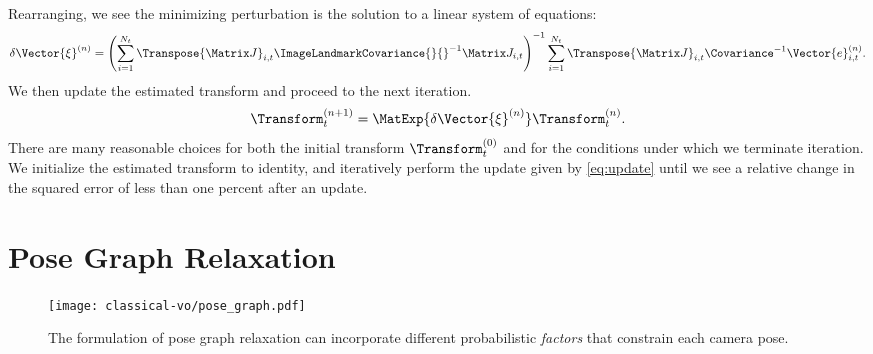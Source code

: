 Rearranging, we see the minimizing perturbation is the solution to a
linear system of equations:
\begin{equation}
  \delta\Vector{\xi}^{(n)} = 
  \left( \sum_{i=1}^{N_t} \Transpose{\Matrix J}_{i,t}
  \ImageLandmarkCovariance{}{}^{-1} \Matrix J_{i,t} \right)^{-1}
  \sum_{i=1}^{N_t} \Transpose{\Matrix J}_{i,t}
  \Covariance^{-1} \Vector{e}_{i,t}^{(n)}. 
\label{eq:least-squares-iteration}
\end{equation}
We then update the estimated transform and proceed to the next iteration.
\begin{equation}
  \Transform_t^{(n+1)} = \MatExp{\delta\Vector{\xi}^{(n)}} \Transform_t^{(n)}. \label{eq:update}
\end{equation}
There are many reasonable choices for both the initial transform
$\Transform_t^{(0)}$ and for the conditions under which we terminate
iteration. We initialize the estimated transform to identity, and iteratively
perform the update given by \cref{eq:update} until we see a relative change in
the squared error of less than one percent after an update. 


\section{Pose Graph Relaxation}

\begin{wrapfigure}{r}{0.4\textwidth}
  \vspace{-20pt}
  \begin{center}
	\texttt{[image: classical-vo/pose\_graph.pdf]}
  \end{center}
    \vspace{-20pt}
	\label{fig:math_pose_graph}
	\caption{The formulation of pose graph relaxation can incorporate different probabilistic \textit{factors} that constrain each camera pose.}
\end{wrapfigure} 


